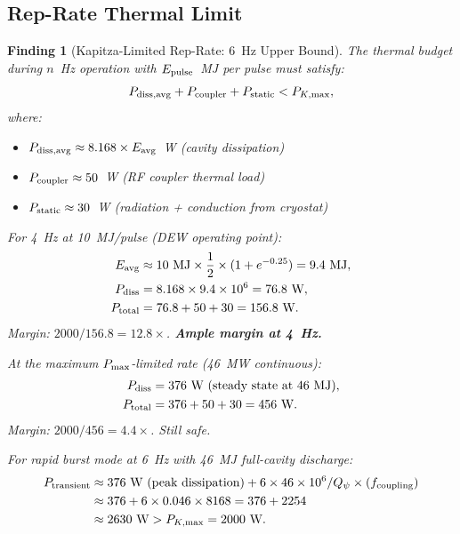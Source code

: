 \documentclass[11pt]{article}
\newtheorem{finding}{Finding}
\newcommand{\ee}[1]{\times 10^{#1}}
\begin{document}
\subsection{Rep-Rate Thermal Limit}

\begin{finding}[Kapitza-Limited Rep-Rate: 6~Hz Upper Bound]
\label{find:kapitza}
The thermal budget during $n$~Hz operation with $E_{\rm pulse}$~MJ
per pulse must satisfy:
\begin{equation}
P_{\rm diss,avg} + P_{\rm coupler} + P_{\rm static} < P_{K,\rm max},
\end{equation}
where:
\begin{itemize}[nosep]
  \item $P_{\rm diss,avg} \approx 8.168 \times E_{\rm avg}$~W
    (cavity dissipation)
  \item $P_{\rm coupler} \approx 50$~W (RF coupler thermal load)
  \item $P_{\rm static} \approx 30$~W (radiation + conduction from
    cryostat)
\end{itemize}

For 4~Hz at 10~MJ/pulse (DEW operating point):
\begin{align}
E_{\rm avg} &\approx 10~\text{MJ} \times \frac{1}{2}
  \times (1 + e^{-0.25}) = 9.4~\text{MJ}, \\
P_{\rm diss} &= 8.168 \times 9.4\ee{6} = 76.8~\text{W}, \\
P_{\rm total} &= 76.8 + 50 + 30 = 156.8~\text{W}.
\end{align}
Margin: $2000/156.8 = 12.8\times$. \textbf{Ample margin at 4~Hz.}

At the maximum $P_{\rm max}$-limited rate (46~MW continuous):
\begin{align}
P_{\rm diss} &= 376~\text{W (steady state at 46~MJ)}, \\
P_{\rm total} &= 376 + 50 + 30 = 456~\text{W}.
\end{align}
Margin: $2000/456 = 4.4\times$. Still safe.

For rapid burst mode at 6~Hz with 46~MJ full-cavity discharge:
\begin{align}
P_{\rm transient} &\approx 376~\text{W (peak dissipation)}
  + 6 \times 46\ee{6}/Q_\psi \times (f_{\rm coupling}) \\
&\approx 376 + 6 \times 0.046 \times 8168 = 376 + 2254 \\
&\approx 2630~\text{W} > P_{K,\rm max} = 2000~\text{W}.
\end{align}


\end{finding}
\end{document}
